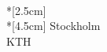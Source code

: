 \thispagestyle{empty}
\vspace*{\fill}
\begin{center}
{\huge\ttitle}\\*[2.5cm]
\Large\sf\thesisauthor\\*[4.5cm]
\small\sf Stockholm \thesisyear\\
{\sf KTH}\\
\end{center}
\vspace*{\fill}

